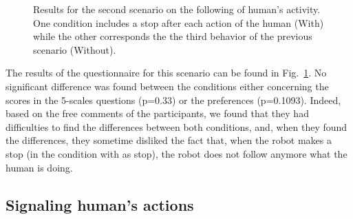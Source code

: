 \documentclass[english,a4paper,11pt,twoside]{StyleThese}
\begin{document}
\begin{figure}[!h]
\centering
    \caption{Results for the second scenario on the following of human's activity. One condition includes a stop after each action of the human (With) while the other corresponds the the third behavior of the previous scenario (Without).}
    \label{fig:resSce3}
\end{figure}

The results of the questionnaire for this scenario can be found in Fig.~\ref{fig:resSce3}. No significant difference was found between the conditions either concerning the scores in the 5-scales questions (p=0.33) or the preferences (p=0.1093). Indeed, based on the free comments of the participants, we found that they had difficulties to find the differences between both conditions, and, when they found the differences, they sometime disliked the fact that, when the robot makes a stop (in the condition with as stop), the robot does not follow anymore what the human is doing.


\subsection{Signaling human's actions}
\end{document}
